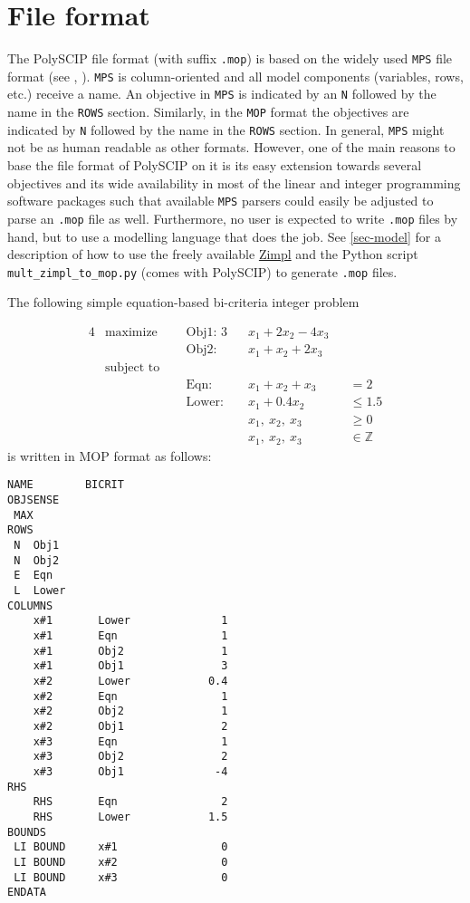 \documentclass[11pt,listof=totoc]{scrartcl}
\theoremstyle{definition}
\begin{document}
\section{File format}\label{sec-format}

The PolySCIP file format (with suffix \texttt{.mop}) is based on the
widely used \texttt{MPS} file format (see \cite{mps-format},
\cite{mps-format2}). \texttt{MPS} is column-oriented and all model
components (variables, rows, etc.)  receive a name. An objective in
\texttt{MPS} is indicated by an \texttt{N} followed by the name in the
\texttt{ROWS} section. Similarly, in the \texttt{MOP} format the
objectives are indicated by \texttt{N} followed by the name in the
\texttt{ROWS} section. In general, \texttt{MPS} might not be as human
readable as other formats. However, one of the main reasons to base
the file format of PolySCIP on it is its easy extension towards
several objectives and its wide availability in most of the linear and
integer programming software packages such that available \texttt{MPS}
parsers could easily be adjusted to parse an \texttt{.mop} file as
well. Furthermore, no user is expected to write \texttt{.mop} files by
hand, but to use a modelling language that does the job. See
\cref{sec-model} for a description of how to use the freely available
\href{http://zimpl.zib.de}{Zimpl} and the Python script
\texttt{mult\_zimpl\_to\_mop.py} (comes with PolySCIP) to generate
\texttt{.mop} files.

The following simple equation-based bi-criteria
integer problem

\begin{alignat}{4}
&\mbox{maximize}~~~ &&\mbox{Obj1: } 3&&x_1 + 2 x_2 - 4 x_3 &&
\nonumber \\
& &&\mbox{Obj2: } &&x_1 + x_2 + 2 x_3 && \nonumber \\
&\mbox{subject to} && && && \nonumber \\
& &&\mbox{Eqn: } &&x_1 + x_2 + x_3 &&= 2 \label{biCritExample}\\
& &&\mbox{Lower: } &&x_1 + 0.4 x_2 &&\leq 1.5 \nonumber \\
& && &&x_1,~ x_2,~ x_3 &&\geq 0 \nonumber \\
& && &&x_1,~ x_2,~ x_3 &&\in \mathbb{Z} \nonumber
\end{alignat}
is written in MOP format as follows:
\begin{verbatim}
NAME        BICRIT
OBJSENSE
 MAX
ROWS
 N  Obj1
 N  Obj2
 E  Eqn
 L  Lower
COLUMNS
    x#1       Lower              1
    x#1       Eqn                1
    x#1       Obj2               1
    x#1       Obj1               3
    x#2       Lower            0.4
    x#2       Eqn                1
    x#2       Obj2               1
    x#2       Obj1               2
    x#3       Eqn                1
    x#3       Obj2               2
    x#3       Obj1              -4
RHS
    RHS       Eqn                2
    RHS       Lower            1.5
BOUNDS
 LI BOUND     x#1                0
 LI BOUND     x#2                0
 LI BOUND     x#3                0
ENDATA
\end{verbatim}
\end{document}
